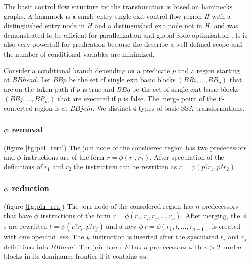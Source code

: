 The basic control flow structure for the transfomation is based on hammocks graphs. A hammock is a single-entry single-exit control flow region $H$ with a distinguished entry node in $H$ and a distinguished exit node not in $H$. \cite{Ferrante:1987:PDG:24039.24041} and was demonstrated to be efficient for parallelization and global code optimisation \cite{Zhang:2004:UHG:977250.977393}. Is is also very powerfull for predication because the describe a well defined scope and the number of conditional variables are minimized.

Consider a conditional branch depending on a predicate $p$ and a region starting at $BBhead$. Let $BBp$ be the set of single exit basic blocks $(BBi,\dots,BB_n)$ that are on the taken path if $p$ is true and $BBq$ be the set of single exit basic blocks $(BBj,\dots,BB_m)$ that are executed if $p$ is false. The merge point of the if-converted region is at $BBjoin$. We distinct 4 types of basic SSA transformations.

\subsubsection{$\phi$ removal} (figure \ref{fig:phi_rem})
The join node of the considered region has two predecessors and $\phi$ instructions are of the form $r=\phi(r_1,r_2)$. After speculation of the definitions of $r_1$ and $r_2$ the instruction can be rewritten as $r=\psi(p?r_1,\overline{p}?r_2)$.
\subsubsection{$\phi$ reduction} (figure \ref{fig:phi_red})
 The join node of the considered region has $n$ predecessors that have $\phi$ instructions of the form $r=\phi(r_1,r_i,r_j,\dots,r_n)$. After merging, the $\phi$s are rewritten $t=\psi(p?r_i,\overline{p}?r_j)$ and a new $\phi\:r=\phi(r_1,t,\dots,r_{n-1})$ is created with one operand less. The $\psi$ instruction is inserted after the speculated $r_i$ and $r_j$ definitions into $BBhead$.
The join block $E$ has $n$ predecessors with $n > 2$, and $n$ blocks in its dominance frontier if it contains $\phi$s.
